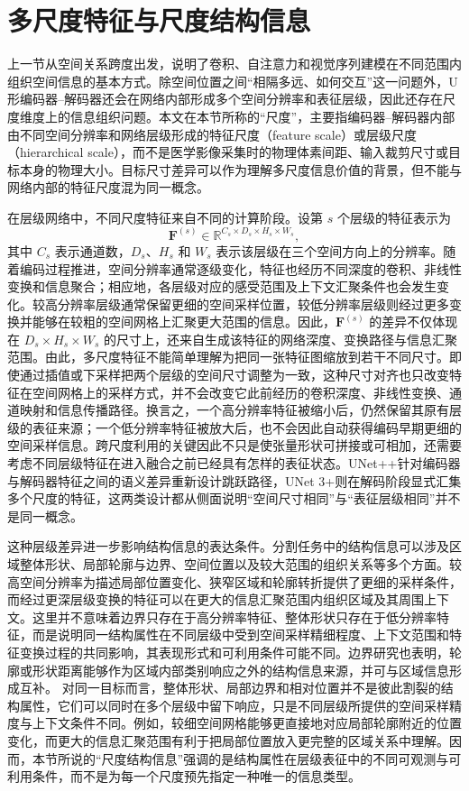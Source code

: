 \section{多尺度特征与尺度结构信息}

上一节从空间关系跨度出发，说明了卷积、自注意力和视觉序列建模在不同范围内组织空间信息的基本方式。除空间位置之间“相隔多远、如何交互”这一问题外，U形编码器--解码器还会在网络内部形成多个空间分辨率和表征层级，因此还存在尺度维度上的信息组织问题。本文在本节所称的“尺度”，主要指编码器--解码器内部由不同空间分辨率和网络层级形成的特征尺度（feature scale）或层级尺度（hierarchical scale），而不是医学影像采集时的物理体素间距、输入裁剪尺寸或目标本身的物理大小。目标尺寸差异可以作为理解多尺度信息价值的背景，但不能与网络内部的特征尺度混为同一概念。

在层级网络中，不同尺度特征来自不同的计算阶段。设第 \(s\) 个层级的特征表示为
\begin{equation}
\label{eq:ch2-scale-feature}
\mathbf{F}^{(s)}\in\mathbb{R}^{C_s\times D_s\times H_s\times W_s},
\end{equation}
其中 \(C_s\) 表示通道数，\(D_s\)、\(H_s\) 和 \(W_s\) 表示该层级在三个空间方向上的分辨率。随着编码过程推进，空间分辨率通常逐级变化，特征也经历不同深度的卷积、非线性变换和信息聚合；相应地，各层级对应的感受范围及上下文汇聚条件也会发生变化。较高分辨率层级通常保留更细的空间采样位置，较低分辨率层级则经过更多变换并能够在较粗的空间网格上汇聚更大范围的信息。因此，\(\mathbf{F}^{(s)}\) 的差异不仅体现在 \(D_s\times H_s\times W_s\) 的尺寸上，还来自生成该特征的网络深度、变换路径与信息汇聚范围。由此，多尺度特征不能简单理解为把同一张特征图缩放到若干不同尺寸。即使通过插值或下采样把两个层级的空间尺寸调整为一致，这种尺寸对齐也只改变特征在空间网格上的采样方式，并不会改变它此前经历的卷积深度、非线性变换、通道映射和信息传播路径。换言之，一个高分辨率特征被缩小后，仍然保留其原有层级的表征来源；一个低分辨率特征被放大后，也不会因此自动获得编码早期更细的空间采样信息。跨尺度利用的关键因此不只是使张量形状可拼接或可相加，还需要考虑不同层级特征在进入融合之前已经具有怎样的表征状态。UNet++针对编码器与解码器特征之间的语义差异重新设计跳跃路径，UNet 3+则在解码阶段显式汇集多个尺度的特征，这两类设计都从侧面说明“空间尺寸相同”与“表征层级相同”并不是同一概念。\cite{zhou2018unetpp,huang2020unet3plus}

这种层级差异进一步影响结构信息的表达条件。分割任务中的结构信息可以涉及区域整体形状、局部轮廓与边界、空间位置以及较大范围的组织关系等多个方面。较高空间分辨率为描述局部位置变化、狭窄区域和轮廓转折提供了更细的采样条件，而经过更深层级变换的特征可以在更大的信息汇聚范围内组织区域及其周围上下文。这里并不意味着边界只存在于高分辨率特征、整体形状只存在于低分辨率特征，而是说明同一结构属性在不同层级中受到空间采样精细程度、上下文范围和特征变换过程的共同影响，其表现形式和可利用条件可能不同。边界研究也表明，轮廓或形状距离能够作为区域内部类别响应之外的结构信息来源，并可与区域信息形成互补。\cite{kervadec2021boundary} 对同一目标而言，整体形状、局部边界和相对位置并不是彼此割裂的结构属性，它们可以同时在多个层级中留下响应，只是不同层级所提供的空间采样精度与上下文条件不同。例如，较细空间网格能够更直接地对应局部轮廓附近的位置变化，而更大的信息汇聚范围有利于把局部位置放入更完整的区域关系中理解。因而，本节所说的“尺度结构信息”强调的是结构属性在层级表征中的不同可观测与可利用条件，而不是为每一个尺度预先指定一种唯一的信息类型。

